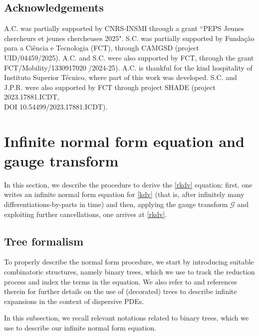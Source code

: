 \documentclass[a4paper,
11pt,  reqno]{amsart}
\newcommand{\5}{\textup{V}}
\theoremstyle{remark}
\newcommand{\Gc}{\mathcal{G}}
\numberwithin{equation}{section}
\numberwithin{theorem}{section}
\begin{document}
\subsection{Acknowledgements} A.C. was partially supported by  CNRS-INSMI through a grant ``PEPS Jeunes chercheurs et jeunes chercheuses 2025". S.C. was partially supported by Funda\c{c}\~ao para a Ci\^encia e Tecnologia (FCT), through CAMGSD (project UID/04459/2025). A.C. and S.C. were also supported by FCT, through the grant FCT/Mobility/1330917020 /2024-25). A.C. is thankful for the kind hospitality of Instituto Superior Técnico, where part of this work was developed. S.C. and J.P.R. were also supported by FCT through project SHADE (project 2023.17881.ICDT, \\
DOI 10.54499/2023.17881.ICDT).



\section{Infinite normal form equation and gauge transform}\label{sec:infr}


In this section, we describe the procedure to derive the \eqref{rkdv} equation:
first, one writes an infinite normal form equation for \eqref{kdv} (that is, after infinitely
many differentiations-by-parts in time) and then, applying the gauge transform $\Gc$ and exploiting further cancellations, one arrives at \eqref{rkdv}.




\subsection{Tree formalism}
\label{SUB:tree}


To properly describe the normal form procedure, we start by introducing suitable combinatoric structures, namely  binary trees, which we use to track the reduction process and index the terms in the equation.
We also refer to \cite{Bruned, Christ_power, GuoKwonOh_nls,kishimoto, KOY20} and references therein for further details on the use of (decorated) trees to describe infinite expansions in the context of dispersive PDEs.

In this subsection, we recall relevant notations related to binary trees, which we use to describe our infinite normal form equation.
\end{document}
